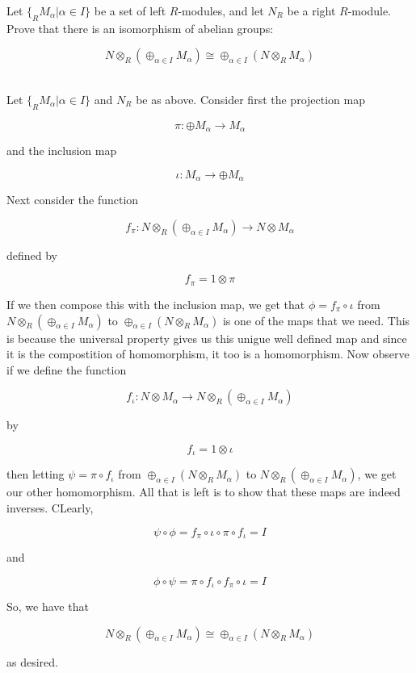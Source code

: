 Let $\{_RM_{\alpha}|\alpha\in I\}$ be a set of left $R$-modules, and let $N_R$ be a right $R$-module.
Prove that there is an isomorphism of abelian groups: 

$$N\otimes_R(\oplus_{\alpha\in I}M_{\alpha})\cong\oplus_{\alpha\in I}(N\otimes_RM_{\alpha})$$

\begin{solution}\renewcommand{\qedsymbol}{}\ \\
    Let $\{_RM_{\alpha}|\alpha\in I\}$ and $N_R$ be as above. Consider first the projection map

    $$\pi:\oplus M_{\alpha}\to M_{\alpha}$$

    and the inclusion map

    $$\iota:M_{\alpha}\to\oplus M_{\alpha}$$

    Next consider the function
    
    $$f_{\pi}:N\otimes_R(\oplus_{\alpha\in I}M_{\alpha})\to N\otimes M_{\alpha}$$

    defined by

    $$f_{\pi}=1\otimes\pi$$

    If we then compose this with the inclusion map, we get that $\phi=f_{\pi}\circ\iota$ from 
    $N\otimes_R(\oplus_{\alpha\in I}M_{\alpha})$ to $\oplus_{\alpha\in I}(N\otimes_RM_{\alpha})$ is one
    of the maps that we need. This is because the universal property gives us this unigue well defined
    map and since it is the compostition of homomorphism, it too is a homomorphism. Now observe if we
    define the function

    $$f_{\iota}:N\otimes M_{\alpha}\to N\otimes_R(\oplus_{\alpha\in I}M_{\alpha})$$

    by

    $$f_{\iota}=1\otimes\iota$$

    then letting $\psi=\pi\circ f_{\iota}$ from $\oplus_{\alpha\in I}(N\otimes_RM_{\alpha})$ to
    $N\otimes_R(\oplus_{\alpha\in I}M_{\alpha})$, we get our other homomorphism. All that is left is to
    show that these maps are indeed inverses. CLearly,

    $$\psi\circ\phi=f_{\pi}\circ\iota\circ\pi\circ f_{\iota}=I$$

    and

    $$\phi\circ\psi=\pi\circ f_{\iota}\circ f_{\pi}\circ\iota=I$$

    So, we have that

    $$N\otimes_R(\oplus_{\alpha\in I}M_{\alpha})\cong\oplus_{\alpha\in I}(N\otimes_RM_{\alpha})$$

    as desired.


\end{solution}